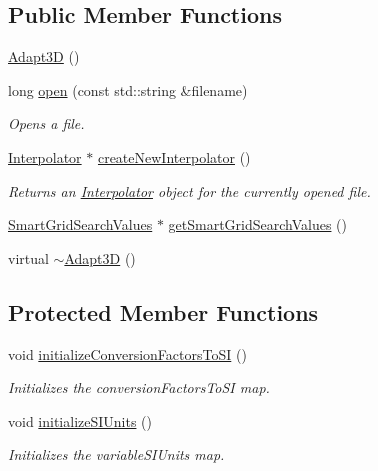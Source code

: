 \subsection*{Public Member Functions}
\begin{DoxyCompactItemize}
\item 
\hyperlink{classccmc_1_1_adapt3_d_aa3927c68c63cde9e4006c0f8687116cb}{Adapt3\-D} ()
\item 
long \hyperlink{classccmc_1_1_adapt3_d_a02a5f2b5ba26cacd93f7c41c68c4b24a}{open} (const std\-::string \&filename)
\begin{DoxyCompactList}\small\item\em Opens a file.  \end{DoxyCompactList}\item 
\hyperlink{classccmc_1_1_interpolator}{Interpolator} $\ast$ \hyperlink{classccmc_1_1_adapt3_d_a4a82029cb4669a788c7ffa555fa4c20f}{create\-New\-Interpolator} ()
\begin{DoxyCompactList}\small\item\em Returns an \hyperlink{classccmc_1_1_interpolator}{Interpolator} object for the currently opened file.  \end{DoxyCompactList}\item 
\hyperlink{structccmc_1_1_smart_grid_search_values}{Smart\-Grid\-Search\-Values} $\ast$ \hyperlink{classccmc_1_1_adapt3_d_aba33c6663d647dc3d00e9007c909a7ed}{get\-Smart\-Grid\-Search\-Values} ()
\item 
virtual \hyperlink{classccmc_1_1_adapt3_d_ac27c4556b1091bf63e5931ecadb37462}{$\sim$\-Adapt3\-D} ()
\end{DoxyCompactItemize}
\subsection*{Protected Member Functions}
\begin{DoxyCompactItemize}
\item 
void \hyperlink{classccmc_1_1_adapt3_d_aa4f0803514d069d146fdf58691b82d7a}{initialize\-Conversion\-Factors\-To\-S\-I} ()
\begin{DoxyCompactList}\small\item\em Initializes the conversion\-Factors\-To\-S\-I map.  \end{DoxyCompactList}\item 
void \hyperlink{classccmc_1_1_adapt3_d_a00d25fcceb69cc274df1c5e671f620e5}{initialize\-S\-I\-Units} ()
\begin{DoxyCompactList}\small\item\em Initializes the variable\-S\-I\-Units map.  \end{DoxyCompactList}\end{DoxyCompactItemize}

